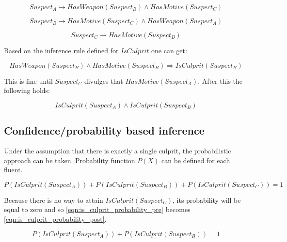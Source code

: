 \begin{equation}
    Suspect_A \rightarrow HasWeapon \left( Suspect_B \right) \land HasMotive \left( Suspect_C \right)
\end{equation}

\begin{equation}
    Suspect_B \rightarrow HasMotive \left( Suspect_C \right) \land HasWeapon \left( Suspect_A \right)
\end{equation}

\begin{equation}
    Suspect_C \rightarrow HasMotive \left( Suspect_B \right)
\end{equation}

Based on the inference rule defined for $IsCulprit$ one can get:

\begin{equation}
    HasWeapon \left( Suspect_B \right) \land HasMotive \left( Suspect_B \right) \Rightarrow  IsCulprit \left( Suspect_B \right)
\end{equation}

This is fine until $Suspect_C$ divulges that $HasMotive \left( Suspect_A \right)$.
After this the following holds:

\begin{equation}
    IsCulprit \left( Suspect_A \right) \land IsCulprit \left( Suspect_B \right)
\end{equation}

\subsection{Confidence/probability based inference}

Under the assumption that there is exactly a single culprit, the probabilistic approach can be taken.
Probability function $P(X)$ can be defined for each fluent.

\begin{equation}
    \label{eqn:is_culprit_probability_pre}
    P \left( IsCulprit \left( Suspect_A \right) \right) + P \left( IsCulprit \left( Suspect_B \right) \right) + P \left( IsCulprit \left( Suspect_C \right) \right) = 1
\end{equation}

Because there is no way to attain $IsCulprit \left( Suspect_C \right)$, its probability will be equal to zero and so \ref{eqn:is_culprit_probability_pre} becomes \ref{eqn:is_culprit_probability_post}.

\begin{equation}
    \label{eqn:is_culprit_probability_post}
    P \left( IsCulprit \left( Suspect_A \right) \right) + P \left( IsCulprit \left( Suspect_B \right) \right) = 1
\end{equation}


